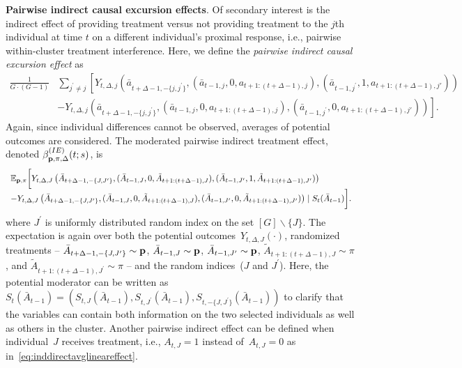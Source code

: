 \documentclass[lineno]{biometrika}
\begin{document}
\noindent \textbf{Pairwise indirect causal excursion effects}.
Of secondary interest is the indirect effect of providing treatment versus not providing treatment to the $j$th individual at time $t$ on a different individual's proximal response, i.e., pairwise within-cluster treatment interference.  Here, we define the  \emph{pairwise indirect causal excursion effect} as
\begin{align}
\frac{1}{G \cdot (G-1)} &\sum_{j^\prime \neq j} \left[Y_{t,\Delta,j} (\bar a_{t+\Delta-1,-\{j, j^\prime\}}, (\bar a_{t-1,j}, 0, a_{t+1:(t+\Delta-1),j}), (\bar a_{t-1,j^\prime}, 1, a_{t+1:(t+\Delta-1),j'})) \right.\nonumber\\
&- \left.Y_{t,\Delta,j} (\bar a_{t+\Delta-1,-\{j, j^\prime\}}, (\bar a_{t-1,j}, 0, a_{t+1:(t+\Delta-1),j}), (\bar a_{t-1,j^\prime}, 0, a_{t+1:(t+\Delta-1),j'})) \nonumber \right].
\end{align}
Again, since individual differences cannot be observed, averages of potential outcomes are considered. The moderated pairwise indirect treatment effect, denoted $\beta^{(IE)}_{{\bf p}, \pi, \Delta} (t; s)$, is
\begin{equation}
\label{eq:inddirectavglineareffect}
\begin{array}{r@{}l}
&\mathbb{E}_{{\bf p}, \pi} \bigg[ Y_{t,\Delta,J} \left(\bar A_{t+\Delta-1,-\{J, J^\prime\}}, (\bar A_{t-1,J}, 0, \tilde A_{t+1:(t+\Delta-1),J}), (\bar A_{t-1,J'}, 1, \tilde A_{t+1:(t+\Delta-1),J'}) \right) \\
&- Y_{t,\Delta,J} \left(\bar A_{t+\Delta-1,-\{J, J^\prime\}}, (\bar A_{t-1,J}, 0, \tilde A_{t+1:(t+\Delta-1),J}), (\bar A_{t-1,J'}, 0, \tilde A_{t+1:(t+\Delta-1),J'}) \right) \mid S_t (\bar A_{t-1}) \bigg].
\end{array}
\end{equation}
where $J^\prime$ is uniformly distributed random index on the set $[G] \backslash \{J\}$. The expectation is again over both the potential outcomes~$Y_{t,\Delta,J}(\cdot)$, randomized treatments -- $\bar A_{t+\Delta-1,-\{J,J^\prime\}} \sim {\bf p}$, $\bar A_{t-1,J} \sim {\bf p}$, $\bar A_{t-1,J^\prime} \sim {\bf p}$, $\tilde A_{t+1:(t+\Delta-1),J} \sim \pi$, and $\tilde A_{t+1:(t+\Delta-1),J^\prime} \sim \pi$ --  and the random indices~($J$ and $J^\prime$). Here, the potential moderator can be written as $S_t (\bar A_{t-1}) = \left( S_{t,J} (\bar A_{t-1}), S_{t,J^\prime} (\bar A_{t-1}), S_{t,-\{J, J^\prime \}} (\bar A_{t-1}) \right)$ to clarify that the variables can contain both information on the two selected individuals as well as others in the cluster. Another pairwise indirect effect can be defined when individual~$J$ receives treatment, i.e., $A_{t,J} = 1$ instead of~$A_{t,J} = 0$ as in~\eqref{eq:inddirectavglineareffect}.
\end{document}

